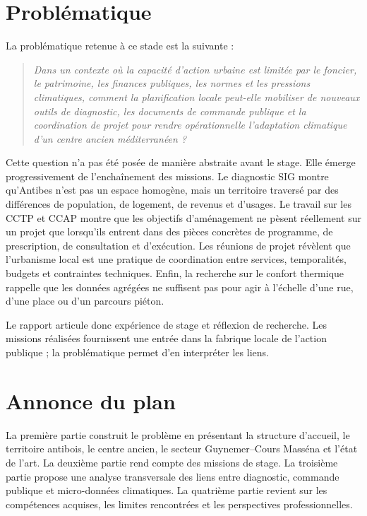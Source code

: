 \documentclass[11pt,a4paper]{report}
\begin{document}
\section*{Problématique}

La problématique retenue à ce stade est la suivante :

\begin{quote}
\emph{Dans un contexte où la capacité d'action urbaine est limitée par le foncier, le patrimoine, les finances publiques, les normes et les pressions climatiques, comment la planification locale peut-elle mobiliser de nouveaux outils de diagnostic, les documents de commande publique et la coordination de projet pour rendre opérationnelle l'adaptation climatique d'un centre ancien méditerranéen ?}
\end{quote}

Cette question n'a pas été posée de manière abstraite avant le stage. Elle émerge progressivement de l'enchaînement des missions. Le diagnostic SIG montre qu'Antibes n'est pas un espace homogène, mais un territoire traversé par des différences de population, de logement, de revenus et d'usages. Le travail sur les CCTP et CCAP montre que les objectifs d'aménagement ne pèsent réellement sur un projet que lorsqu'ils entrent dans des pièces concrètes de programme, de prescription, de consultation et d'exécution. Les réunions de projet révèlent que l'urbanisme local est une pratique de coordination entre services, temporalités, budgets et contraintes techniques. Enfin, la recherche sur le confort thermique rappelle que les données agrégées ne suffisent pas pour agir à l'échelle d'une rue, d'une place ou d'un parcours piéton.

Le rapport articule donc expérience de stage et réflexion de recherche. Les missions réalisées fournissent une entrée dans la fabrique locale de l'action publique ; la problématique permet d'en interpréter les liens.

\section*{Annonce du plan}

La première partie construit le problème en présentant la structure d'accueil, le territoire antibois, le centre ancien, le secteur Guynemer--Cours Masséna et l'état de l'art. La deuxième partie rend compte des missions de stage. La troisième partie propose une analyse transversale des liens entre diagnostic, commande publique et micro-données climatiques. La quatrième partie revient sur les compétences acquises, les limites rencontrées et les perspectives professionnelles.
\end{document}
